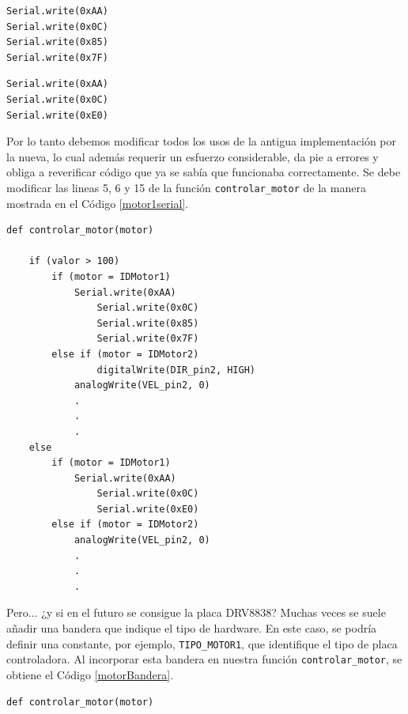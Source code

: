 \begin{itemize}
\begin{lstlisting}[caption=Configuración de la placa de control del motor DC utiliza comunicación serie., label={listingDistinto}]
    \end{lstlisting}
\begin{lstlisting}[caption=Establecer máxima velocidad giro horario para el caso de comunicación en serie., label={maxSerial}]
Serial.write(0xAA)
Serial.write(0x0C)
Serial.write(0x85)
Serial.write(0x7F)
\end{lstlisting}
\begin{lstlisting}[caption=Establecer detención para el caso de comunicación en serie., label={detSerial}]
Serial.write(0xAA)
Serial.write(0x0C)
Serial.write(0xE0)
\end{lstlisting}
    Por lo tanto debemos modificar todos los usos de la antigua implementación por la nueva, lo cual además requerir un esfuerzo considerable, da pie a errores y obliga a reverificar código que ya se sabía que funcionaba correctamente. Se debe modificar las lineas 5, 6 y 15 de la función \verb|controlar_motor| de la manera mostrada en el Código \ref{motor1serial}.

\begin{lstlisting}[caption=Modificación de la función controlar\_motor para utilizar placa de control serial para controlar el motor 1.,label={motor1serial}]
def controlar_motor(motor)

	if (valor > 100)
		if (motor = IDMotor1)
    		Serial.write(0xAA)
				Serial.write(0x0C)
				Serial.write(0x85)
				Serial.write(0x7F)
		else if (motor = IDMotor2)
				digitalWrite(DIR_pin2, HIGH)
	    	analogWrite(VEL_pin2, 0)
	    	.
	    	.
	    	.
	else
		if (motor = IDMotor1)
	    	Serial.write(0xAA)
				Serial.write(0x0C)
				Serial.write(0xE0)
		else if (motor = IDMotor2)
	    	analogWrite(VEL_pin2, 0)
	    	.
	    	.
	    	.

\end{lstlisting}

Pero... ¿y si en el futuro se consigue la placa \gls{DRV8838}? Muchas veces se suele añadir una bandera que indique el tipo de hardware. En este caso, se podría definir una constante, por ejemplo, \verb|TIPO_MOTOR1|, que identifique el tipo de placa controladora. Al incorporar esta bandera en nuestra función \verb|controlar_motor|, se obtiene el Código \ref{motorBandera}.

\begin{lstlisting}[caption=Modificación de la función controlar\_motor para utilizar bandera indicadora de tipo de placa controladora.,label={motorBandera}]
def controlar_motor(motor)


\end{lstlisting}
\end{itemize}
